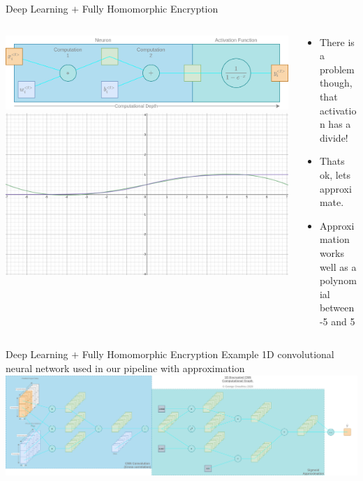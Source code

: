 \documentclass[aspectratio=169]{beamer}
\begin{document}
    \begin{frame}{Deep Learning $+$ Fully Homomorphic Encryption}
      \begin{columns}
        \begin{column}{0.5\textwidth}
          \includegraphics[width=1\linewidth]{neuron.png}
          \includegraphics[width=1\linewidth]{desmos.png}
        \end{column}
        \begin{column}{0.5\textwidth}
          \begin{itemize}
            \item There is a problem though, that activation has a divide!
            \item Thats ok, lets approximate. \cite{cryptoeprint:2018:462}
            \item Approximation works well as a polynomial between -5 and 5
          \end{itemize}
        \end{column}
      \end{columns}
    \end{frame}

    \begin{frame}{Deep Learning $+$ Fully Homomorphic Encryption}
      Example 1D \cite{kiranyaz20191d, hatami2018classification} convolutional neural network \cite{Goodfellow-et-al-2016} used in our pipeline with approximation \\
      \includegraphics[width=1\linewidth]{encrypted_cnn.png}
    \end{frame}
\end{document}
